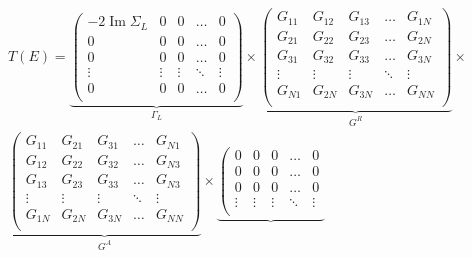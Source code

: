 \begin{equation}
    \begin{split}
        T(E)=\underbrace{\left( \begin{matrix}
        -2\operatorname{Im}{{\Sigma }_{L}} & 0 & 0 & \ldots  & 0  \\
        0 & 0 & 0 & \ldots  & 0  \\
        0 & 0 & 0 & \ldots  & 0  \\
        \vdots  & \vdots  & \vdots  & \ddots  & \vdots   \\
        0 & 0 & 0 & \ldots  & 0  \\
        \end{matrix} \right)}_{{{\Gamma }_{L}}}\times \underbrace{\left( \begin{matrix}
        {{G}_{11}} & {{G}_{12}} & {{G}_{13}} & \ldots  & {{G}_{1N}}  \\
        {{G}_{21}} & {{G}_{22}} & {{G}_{23}} & \ldots  & {{G}_{2N}}  \\
        {{G}_{31}} & {{G}_{32}} & {{G}_{33}} & \ldots  & {{G}_{3N}}  \\
        \vdots  & \vdots  & \vdots  & \ddots  & \vdots   \\
        {{G}_{N1}} & {{G}_{2N}} & {{G}_{3N}} & \ldots  & {{G}_{NN}}  \\
        \end{matrix} \right)}_{{{G}^{R}}}\times  \\ 
        \underbrace{\left( \begin{matrix}
        {{G}_{11}} & {{G}_{21}} & {{G}_{31}} & \ldots  & {{G}_{N1}}  \\
        {{G}_{12}} & {{G}_{22}} & {{G}_{32}} & \ldots  & {{G}_{N3}}  \\
        {{G}_{13}} & {{G}_{23}} & {{G}_{33}} & \ldots  & {{G}_{N3}}  \\
        \vdots  & \vdots  & \vdots  & \ddots  & \vdots   \\
        {{G}_{1N}} & {{G}_{2N}} & {{G}_{3N}} & \ldots  & {{G}_{NN}}  \\
        \end{matrix} \right)}_{{{G}^{A}}}\times \underbrace{\left( \begin{matrix}
        0 & 0 & 0 & \ldots  & 0  \\
        0 & 0 & 0 & \ldots  & 0  \\
        0 & 0 & 0 & \ldots  & 0  \\
        \vdots  & \vdots  & \vdots  & \ddots  & \vdots   \\

\end{matrix}}
\end{split}
\end{equation}
